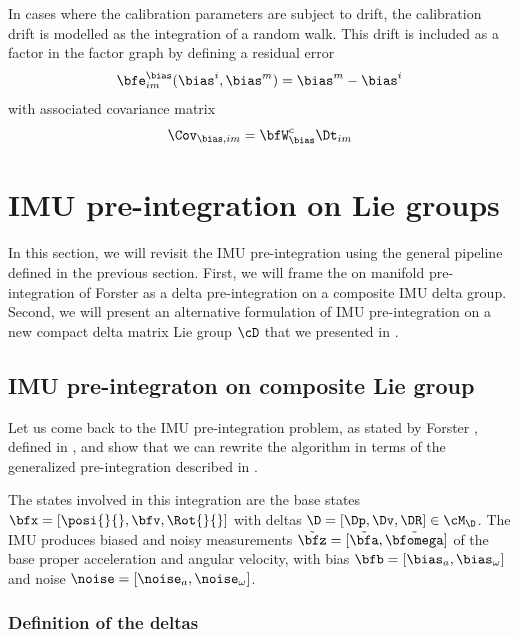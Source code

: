 In cases where the calibration parameters are subject to drift, the calibration drift is modelled as the integration of a random walk. This drift is included as a factor in the factor graph by defining a residual error
%
\begin{equation}
    \bfe^{\bias}_{im}(\bias^i, \bias^m) = \bias^m - \bias^i
\end{equation}
%
with associated covariance matrix
%
\begin{equation}
    \Cov_{\bias,im} = \bfW^c_{\bias} \Dt_{im}
\end{equation}


%
%
%
%
\section{IMU pre-integration on Lie groups}
In this section, we will revisit the IMU pre-integration using the general pipeline defined in the previous section. First, we will frame the on manifold pre-integration
of Forster \cite{forster2015imu, forster2017-TRO} as a delta pre-integration on a composite IMU delta group.
Second, we will present an alternative formulation of IMU pre-integration on a new compact delta matrix Lie group $\cD$ that we presented in \cite{fourmy2019absolute}.

\subsection{IMU pre-integraton on composite Lie group}
\label{sec:imu_preint_composite}

Let us come back to the IMU pre-integration problem, as stated by Forster \cite{lupton-09, forster2015imu}, defined in , and show that we can rewrite the algorithm in terms of the generalized pre-integration described in .

The states involved in this integration are the base states $\bfx = [\posi{}{}, \bfv, \Rot{}{}]$ with deltas $\D=[\Dp,\Dv,\DR] \in \cM_{\D}$. 
The IMU produces biased and noisy measurements $\tilde\bfz = [\tilde\bfa, \tilde{\bfomega}]$ of the base proper acceleration and angular velocity, 
with bias $\bfb = [\bias_{a}, \bias_{\omega}]$ and noise $\noise = [\noise_{a}, \noise_{\omega}]$. 


\subsubsection{Definition of the deltas}


